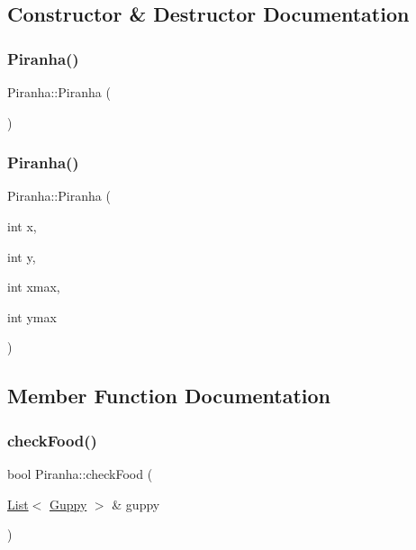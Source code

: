 \subsection{Constructor \& Destructor Documentation}
\mbox{\label{class_piranha_a7e3a4c5c7f458c16717c8cb997fc0331}} 
\subsubsection{\texorpdfstring{Piranha()}{Piranha()}\hspace{0.1cm}{\footnotesize\ttfamily [1/2]}}
{\footnotesize\ttfamily Piranha\+::\+Piranha (\begin{DoxyParamCaption}{ }\end{DoxyParamCaption})}

\mbox{\label{class_piranha_a6ec745c27969134e5a2e4b07ed53d005}} 
\subsubsection{\texorpdfstring{Piranha()}{Piranha()}\hspace{0.1cm}{\footnotesize\ttfamily [2/2]}}
{\footnotesize\ttfamily Piranha\+::\+Piranha (\begin{DoxyParamCaption}\item[{int}]{x,  }\item[{int}]{y,  }\item[{int}]{xmax,  }\item[{int}]{ymax }\end{DoxyParamCaption})}



\subsection{Member Function Documentation}
\mbox{\label{class_piranha_ad7ead5c0a240432a18657b1415cadde0}} 
\subsubsection{\texorpdfstring{check\+Food()}{checkFood()}}
{\footnotesize\ttfamily bool Piranha\+::check\+Food (\begin{DoxyParamCaption}\item[{\mbox{\hyperlink{class_list}{List}}$<$ \mbox{\hyperlink{class_guppy}{Guppy}} $>$ \&}]{guppy }\end{DoxyParamCaption})}

